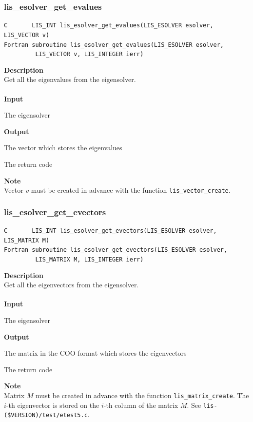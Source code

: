 \documentclass[a4paper]{article}
\newcommand{\namelistlabel}[1]{\mbox{#1}\hfill}
\newenvironment{namelist}[1]{%
\begin{list}{}
  {\let\makelabel\namelistlabel
  \settowidth{\labelwidth}{#1}
  \setlength{\leftmargin}{1.1\labelwidth}}
  }{%
\end{list}}
\begin{document}
\subsubsection{lis\_esolver\_get\_evalues}
\begin{screen}
\verb|C       LIS_INT lis_esolver_get_evalues(LIS_ESOLVER esolver, LIS_VECTOR v)|\\
\verb|Fortran subroutine lis_esolver_get_evalues(LIS_ESOLVER esolver,|\\
\verb|         LIS_VECTOR v, LIS_INTEGER ierr)|
\end{screen}
{\bf Description}\\
\indent
Get all the eigenvalues from the eigensolver.
\\ \\
\noindent
{\bf Input}
\begin{namelist}{XXXXXXXXXXXXXXXXXXXX}
\item[\tt esolver] The eigensolver
\end{namelist}
{\bf Output}
\begin{namelist}{XXXXXXXXXXXXXXXXXXXX}
\item[\tt v]  The vector which stores the eigenvalues
\item[\tt ierr] The return code
\end{namelist}
{\bf Note}\\
\indent
Vector $v$ must be created in advance with the function \verb|lis_vector_create|. 

\newpage
\subsubsection{lis\_esolver\_get\_evectors}
\begin{screen}
\verb|C       LIS_INT lis_esolver_get_evectors(LIS_ESOLVER esolver, LIS_MATRIX M)|\\
\verb|Fortran subroutine lis_esolver_get_evectors(LIS_ESOLVER esolver,|\\
\verb|         LIS_MATRIX M, LIS_INTEGER ierr)|
\end{screen}
{\bf Description}\\
\indent
Get all the eigenvectors from the eigensolver.
\\ \\
\noindent
{\bf Input}
\begin{namelist}{XXXXXXXXXXXXXXXXXXXX}
\item[\tt esolver] The eigensolver
\end{namelist}
{\bf Output}
\begin{namelist}{XXXXXXXXXXXXXXXXXXXX}
\item[\tt M]  The matrix in the COO format which stores the eigenvectors
\item[\tt ierr] The return code
\end{namelist}
{\bf Note}\\
\indent
Matrix $M$ must be created in advance with the function \verb|lis_matrix_create|. The $i$-th eigenvector is stored on the $i$-th column of the matrix $M$. See {\tt lis-(\$VERSION)/test/etest5.c}.
\end{document}
